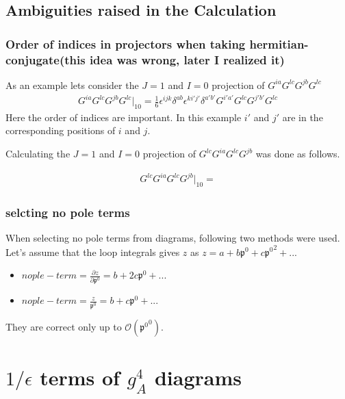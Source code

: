 \documentclass{article}
\newcommand{\bea}{\begin{eqnarray}}
\newcommand{\eea}{\end{eqnarray}}
\begin{document}
\newpage
\subsection{Ambiguities raised in the Calculation}

\subsubsection{Order of indices in projectors when taking hermitian-conjugate(this idea was wrong, later I realized it)}

\vspace{5mm}
As an example lets consider the $J=1$ and $I=0$ projection of $G^{ia}G^{lc}G^{jb}G^{lc}$
\vspace{-4mm}
\bea
G^{ia}G^{lc}G^{jb}G^{lc}\bigg\rvert_{10}= \frac{1}{6}  \epsilon^{i j k} \delta^{a b}  \epsilon^{k i' j'} \delta^{a' b'} G^{i'a'}G^{lc}G^{j'b'}G^{lc} \nonumber
\eea
Here the order of indices are important. In this example $i'$ and $j'$ are in the corresponding positions of $i$ and $j$.

Calculating the $J=1$ and $I=0$ projection of $G^{lc}G^{ia}G^{lc}G^{jb}$ was done as follows.

\bea
G^{lc}G^{ia}G^{lc}G^{jb}\bigg\rvert_{10}=  \nonumber
\eea

\subsubsection{selcting no pole terms}

When selecting no pole terms from diagrams, following two methods were used. Let's assume that the loop integrals gives $z$ as $z=a+b \mathfrak{p^0} +c  \mathfrak{p^0}^2+...$
\begin{itemize}
	\item $nople-term = \frac{\partial z}{\partial \mathfrak{p^0} } = b +2 c \mathfrak{p^0}+...$
	\item $nople-term = \frac{z}{ \mathfrak{p^0} } = b + c \mathfrak{p^0}+...$
\end{itemize}

They are correct only up to $\mathcal{O} \left(\mathfrak{p^0}^0 \right)$.


\newpage
\section{$1/ \epsilon$ terms of $g_A^4$ diagrams}
\end{document}
